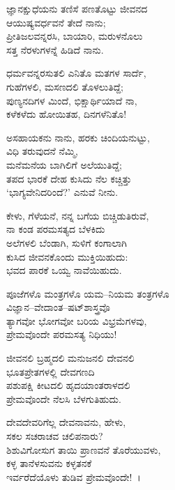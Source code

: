 \begin{myquote}
ಜ್ಞಾನಕ್ಷುಧೆಯನು ತಣಿಸೆ ಪಣತೊಟ್ಟು ಜೀವನದ \\ಆಯುಷ್ಯವರ್ಧವನೆ ತೇದೆ ನಾನು;\\ಪ್ರೀತಿಜಲವನ್ನರಸಿ, ಬಾಯಾರಿ, ಮರುಳನೊಲು\\ಸತ್ತ ನೆರಳುಗಳನ್ನೆ ಹಿಡಿದೆ ನಾನು.
\end{myquote}

\begin{myquote}
ಧರ್ಮವನ್ನರಸುತಲಿ ಎನಿತೊ ಮತಗಳ ಸಾರ್ದೆ,\\ಗುಹೆಗಳಲಿ, ಮಸಣದಲಿ ತೊಳಲುತಿದ್ದೆ;\\ಪುಣ್ಯನದಿಗಳ ಮಿಂದೆ, ಭಿಕ್ಷಾರ್ಥಿಯಾದೆ ನಾ,\\ಕಳೆಕಳೆದು ಹೋಯಿತಹ, ದಿನಗಳೆನಿತೊ!
\end{myquote}

\begin{myquote}
ಅಸಹಾಯಕನು ನಾನು, ಹರಕು ಚಿಂದಿಯನುಟ್ಟು,\\ವಿಧಿ ತರುವುದನೆ ನೆಮ್ಮಿ,\\ಮನೆಮನೆಯ ಬಾಗಿಲಿಗೆ ಅಲೆಯುತಿದ್ದೆ;\\ತಪದ ಭಾರಕೆ ದೇಹ ಕುಸಿದು ನೆಲ ಕಚ್ಚಿತ್ತು\\‘ಭಾಗ್ಯವೇನಿದರಿಂದೆ?’ ಎನುವೆ ನೀನು.
\end{myquote}

\begin{myquote}
ಕೇಳು, ಗೆಳೆಯನೆ, ನನ್ನ ಬಗೆಯ ಬಿಚ್ಚಿಡುತಿರುವೆ,\\ನಾ ಕಂಡ ಪರಮಸತ್ಯದ ಬೆಳಕಿದು\\ಅಲೆಗಳಲಿ ಬೆಂಡಾಗಿ, ಸುಳಿಗೆ ಕಂಗಾಲಾಗಿ\\ಕುಸಿದ ಜೀವನಕೊಂದು ಮುಕ್ತಿಯಿಹುದು:\\ಭವದ ಪಾರಕೆ ಒಯ್ವ ನಾವೆಯಿಹುದು.
\end{myquote}

\begin{myquote}
ಪೂಜೆಗಳೊ ಮಂತ್ರಗಳೊ ಯಮ–ನಿಯಮ ತಂತ್ರಗಳೊ\\ವಿಜ್ಞಾನ–ವೇದಾಂತ–ಷಟ್‌ಶಾಸ್ತ್ರವೊ\\ತ್ಯಾಗವೋ ಭೋಗವೋ ಬರಿಯ ವಿಭ್ರಮೆಗಳವು,\\ಪ್ರೇಮವೊಂದೇ ಪರಮಸತ್ಯ ನಿಧಿಯು!
\end{myquote}

\begin{myquote}
ಜೀವನಲಿ ಬ್ರಹ್ಮದಲಿ ಮನುಜನಲಿ ದೇವನಲಿ\\ಭೂತಪ್ರೇತಗಳಲ್ಲಿ ದೇವಗಣದಿ\\ಪಶುಪಕ್ಷಿ ಕೀಟದಲಿ ಹೃದಯಾಂತರಾಳದಲಿ\\
 ಪ್ರೇಮವೊಂದೇ ನೆಲಸಿ ಬೆಳಗುತಿಹುದು.
\end{myquote}

\begin{myquote}
ದೇವದೇವರಿಗೆಲ್ಲ ದೇವನಾವನು, ಹೇಳು,\\ಸಕಲ ಸಚರಾಚವ ಚಲಿಪನಾರು?\\ಶಿಶುವಿಗೋಸುಗ ತಾಯಿ ಪ್ರಾಣವನೆ ತೊರೆಯುವಳು,\\ಕಳ್ಳ ತಾನೆಳಸುವನು ಕಳ್ಳತನಕೆ\\ಇರ್ವರೆದೆಯೊಳು ತುಡಿವ ಪ್ರೇಮವೊಂದೇ!~।
\end{myquote}

